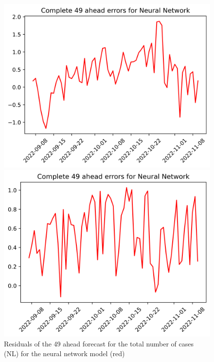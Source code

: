 \begin{figure}

\begin{minipage}{.32\textwidth}
  \centering
  \includegraphics[width=\linewidth]{pics/49_ah/49_ahead_errors_Neural Network.png}
  \caption{Residuals of the 49 ahead forecast for the total number of cases (NL) for the neural network model (red)}
  \label{fig:tot_cases_error_49_nn}
\end{minipage}
\begin{minipage}{.32\textwidth}
  \centering
  \includegraphics[width=\linewidth]{pics/49_ah/DE_49_ahead_errors_Neural Network.png}

\end{minipage}
\end{figure}
